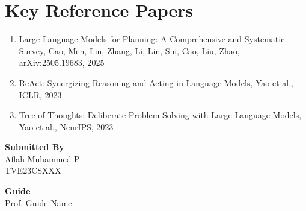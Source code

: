 \documentclass[12pt]{article}
\newcommand{\studentname}{Aflah Muhammed P}
\newcommand{\rollno}{TVE23CSXXX}
\newcommand{\guidename}{Prof. Guide Name}
\begin{document}
\section*{Key Reference Papers}
\begin{enumerate}
  \item Large Language Models for Planning: A Comprehensive and Systematic Survey, Cao, Men, Liu, Zhang, Li, Lin, Sui, Cao, Liu, Zhao, arXiv:2505.19683, 2025
  \item ReAct: Synergizing Reasoning and Acting in Language Models, Yao et al., ICLR, 2023
  \item Tree of Thoughts: Deliberate Problem Solving with Large Language Models, Yao et al., NeurIPS, 2023
\end{enumerate}
\vspace{1.5em}

\noindent\textbf{Submitted By}\\
\studentname\\
\rollno

\vspace{1em}
\noindent\textbf{Guide}\\
\guidename
\end{document}
